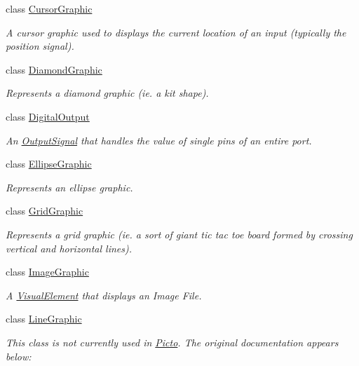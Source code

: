 \begin{DoxyCompactItemize}
class \hyperlink{class_picto_1_1_cursor_graphic}{Cursor\-Graphic}
\begin{DoxyCompactList}\small\item\em A cursor graphic used to displays the current location of an input (typically the position signal). \end{DoxyCompactList}\item 
class \hyperlink{class_picto_1_1_diamond_graphic}{Diamond\-Graphic}
\begin{DoxyCompactList}\small\item\em Represents a diamond graphic (ie. a kit shape). \end{DoxyCompactList}\item 
class \hyperlink{class_picto_1_1_digital_output}{Digital\-Output}
\begin{DoxyCompactList}\small\item\em An \hyperlink{struct_picto_1_1_output_signal}{Output\-Signal} that handles the value of single pins of an entire port. \end{DoxyCompactList}\item 
class \hyperlink{class_picto_1_1_ellipse_graphic}{Ellipse\-Graphic}
\begin{DoxyCompactList}\small\item\em Represents an ellipse graphic. \end{DoxyCompactList}\item 
class \hyperlink{class_picto_1_1_grid_graphic}{Grid\-Graphic}
\begin{DoxyCompactList}\small\item\em Represents a grid graphic (ie. a sort of giant tic tac toe board formed by crossing vertical and horizontal lines). \end{DoxyCompactList}\item 
class \hyperlink{class_picto_1_1_image_graphic}{Image\-Graphic}
\begin{DoxyCompactList}\small\item\em A \hyperlink{struct_picto_1_1_visual_element}{Visual\-Element} that displays an Image File. \end{DoxyCompactList}\item 
class \hyperlink{class_picto_1_1_line_graphic}{Line\-Graphic}
\begin{DoxyCompactList}\small\item\em This class is not currently used in \hyperlink{namespace_picto}{Picto}. The original documentation appears below\-: \end{DoxyCompactList}\item 

\end{DoxyCompactItemize}

